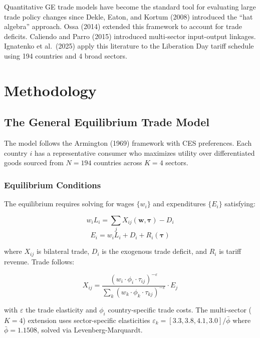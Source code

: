 \documentclass[12pt]{article}
\begin{document}
Quantitative GE trade models have become the standard tool for evaluating
large trade policy changes since Dekle, Eaton, and Kortum (2008) introduced
the ``hat algebra'' approach. Ossa (2014) extended this framework to account
for trade deficits. Caliendo and Parro (2015) introduced multi-sector
input-output linkages. Ignatenko et al.\ (2025) apply this literature to the
Liberation Day tariff schedule using 194 countries and 4 broad sectors.

\section{Methodology}

\subsection{The General Equilibrium Trade Model}

The model follows the Armington (1969) framework with CES preferences.
Each country $i$ has a representative consumer who maximizes utility over
differentiated goods sourced from $N = 194$ countries across $K = 4$ sectors.

\subsubsection{Equilibrium Conditions}

The equilibrium requires solving for wages $\{w_i\}$ and expenditures
$\{E_i\}$ satisfying:

\begin{equation}
w_i L_i = \sum_{j} X_{ij}(\mathbf{w}, \boldsymbol{\tau}) - D_i
\end{equation}
\begin{equation}
E_i = w_i L_i + D_i + R_i(\boldsymbol{\tau})
\end{equation}

where $X_{ij}$ is bilateral trade, $D_i$ is the exogenous trade deficit,
and $R_i$ is tariff revenue. Trade follows:

\begin{equation}
X_{ij} = \frac{(w_i \cdot \phi_i \cdot \tau_{ij})^{-\varepsilon}}
               {\sum_k (w_k \cdot \phi_k \cdot \tau_{kj})^{-\varepsilon}} \cdot E_j
\end{equation}

with $\varepsilon$ the trade elasticity and $\phi_i$ country-specific trade
costs. The multi-sector ($K=4$) extension uses sector-specific elasticities
$\varepsilon_k = [3.3, 3.8, 4.1, 3.0] / \bar{\phi}$ where $\bar{\phi} =
1.1508$, solved via Levenberg-Marquardt.
\end{document}

